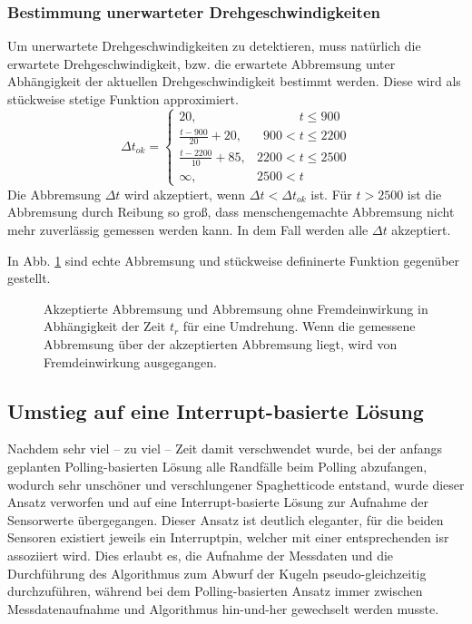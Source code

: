 \documentclass{kis}
\begin{document}
\subsubsection{Bestimmung unerwarteter Drehgeschwindigkeiten}
Um unerwartete Drehgeschwindigkeiten zu detektieren, muss natürlich die erwartete Drehgeschwindigkeit, bzw. die erwartete Abbremsung unter Abhängigkeit der aktuellen Drehgeschwindigkeit bestimmt werden. Diese wird als stückweise stetige Funktion approximiert.
$$\Delta t_{ok} = \begin{cases}
    20, & \phantom{0000 <} t \leq 900\\
    \frac{t-900}{20} + 20, & \phantom{0}900 < t \leq 2200\\
    \frac{t-2200}{10} + 85, & 2200 < t \leq 2500\\
    \infty, & 2500 < t
\end{cases}$$
Die Abbremsung $\Delta t$ wird akzeptiert, wenn $\Delta t < \Delta t_{ok}$ ist. Für $t>2500$ ist die Abbremsung durch Reibung so groß, dass menschengemachte Abbremsung nicht mehr zuverlässig gemessen werden kann. In dem Fall werden alle $\Delta t$ akzeptiert.

In Abb. \ref{fig:acceptable_deceleration} sind echte Abbremsung und stückweise defininerte Funktion gegenüber gestellt.

\begin{figure}
	
	\caption[Akzeptierte Abbremsung der Scheibe.]{Akzeptierte Abbremsung und Abbremsung ohne Fremdeinwirkung in Abhängigkeit der Zeit $t_r$ für eine Umdrehung. Wenn die gemessene Abbremsung über der akzeptierten Abbremsung liegt, wird von Fremdeinwirkung ausgegangen.}
	\label{fig:acceptable_deceleration}
\end{figure}


\subsection{Umstieg auf eine Interrupt-basierte Lösung}
Nachdem sehr viel -- zu viel -- Zeit damit verschwendet wurde, bei der anfangs geplanten Polling-basierten Lösung alle Randfälle beim Polling abzufangen, wodurch sehr unschöner und verschlungener Spaghetticode entstand, wurde dieser Ansatz verworfen und auf eine Interrupt-basierte Lösung zur Aufnahme der Sensorwerte übergegangen. Dieser Ansatz ist deutlich eleganter, für die beiden Sensoren existiert jeweils ein Interruptpin, welcher mit einer entsprechenden \gls{isr} assoziiert wird. Dies erlaubt es, die Aufnahme der Messdaten und die Durchführung des Algorithmus zum Abwurf der Kugeln pseudo-gleichzeitig durchzuführen, während bei dem Polling-basierten Ansatz immer zwischen Messdatenaufnahme und Algorithmus hin-und-her gewechselt werden musste.
\end{document}
